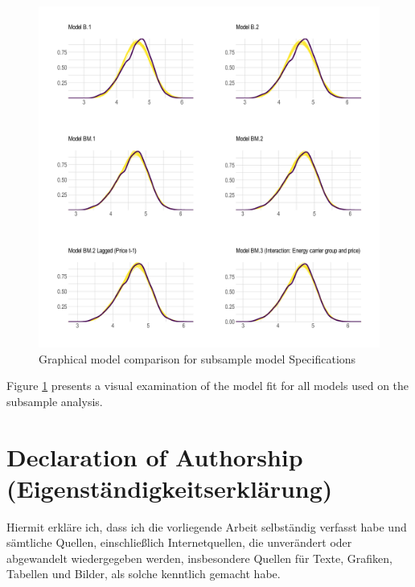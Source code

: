 \documentclass[12pt,twoside]{reedthesis}
\begin{document}
\newpage
\begin{figure}

{\centering \includegraphics[width=1\linewidth]{figure/plot-model-comparison} 

}

\caption{Graphical model comparison for subsample model Specifications}\label{fig:plot-model-comparison}
\end{figure}
\noindent
Figure \ref{fig:plot-model-comparison} presents a visual examination of the model fit for all models used on the subsample analysis.

\newpage

\onehalfspacing

\hypertarget{declaration-of-authorship-eigenstuxe4ndigkeitserkluxe4rung}{%
\chapter*{Declaration of Authorship (Eigenständigkeitserklärung)}\label{declaration-of-authorship-eigenstuxe4ndigkeitserkluxe4rung}}

Hiermit erkläre ich, dass ich die vorliegende Arbeit selbständig verfasst habe und sämtliche Quellen, einschließlich Internetquellen, die unverändert oder abgewandelt wiedergegeben werden, insbesondere Quellen für Texte, Grafiken, Tabellen und Bilder, als solche kenntlich gemacht habe.
\end{document}
